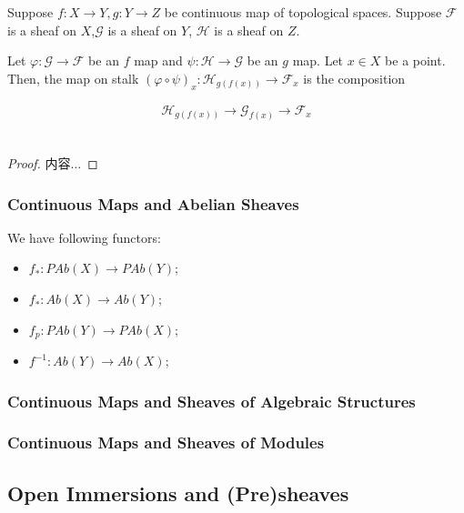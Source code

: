 \documentclass[Total.tex]{subfiles}
\begin{document}
					\begin{lemma}
						Suppose $f:X\rightarrow Y,g:Y\rightarrow Z$ be continuous map of topological spaces. Suppose $\mathcal{F}$ is a sheaf on $X$,$\mathcal{G}$ is a sheaf on $Y$, $\mathcal{H}$ is a sheaf on $Z$.
						
						Let $\varphi:\mathcal{G}\rightarrow \mathcal{F}$ be an $f$ map and $\psi:\mathcal{H}\rightarrow \mathcal{G}$ be an $g$ map. Let $x\in X$ be a point. Then, the map on stalk $(\varphi\circ \psi)_x:\mathcal{H}_{g(f(x))}\rightarrow \mathcal{F}_x$ is the composition
						
						\begin{gather*}
							\mathcal{H}_{g(f(x))}\rightarrow \mathcal{G}_{f(x)}\rightarrow \mathcal{F}_x
						\end{gather*}
\					\end{lemma}
					\begin{proof}
						内容...
					\end{proof}
				
				\subsubsection{Continuous Maps and Abelian Sheaves}
				
				We have following functors:
				
				\begin{itemize}
					\item $f_*:PAb(X)\rightarrow PAb(Y)$;
					\item  $f_*:Ab(X)\rightarrow Ab(Y)$;
					\item $f_p:PAb(Y)\rightarrow PAb(X)$;
					\item $f^{-1}:Ab(Y)\rightarrow Ab(X)$;
				\end{itemize}
				
				\subsubsection{Continuous Maps and Sheaves of Algebraic Structures}
				
				\subsubsection{Continuous Maps and Sheaves of Modules}
			\subsection{Open Immersions and (Pre)sheaves}
			
\end{document}
